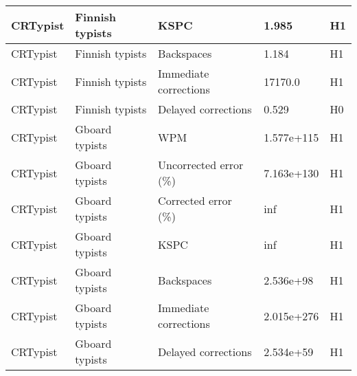 \begin{table}[h!]
\begin{tabular}{|l|l|l|l|l|}
CRTypist & Finnish typists & KSPC & 1.985 & {\cellcolor{bad}} H1 \\ \hline
CRTypist & Finnish typists & Backspaces & 1.184 & {\cellcolor{bad}} H1 \\ \hline
CRTypist & Finnish typists & Immediate corrections & 17170.0 & {\cellcolor{bad}} H1 \\ \hline
CRTypist & Finnish typists & Delayed corrections & 0.529 & {\cellcolor{good}} H0 \\ \hline
CRTypist & Gboard typists & WPM & 1.577e+115 & {\cellcolor{bad}} H1 \\ \hline
CRTypist & Gboard typists & Uncorrected error (\%) & 7.163e+130 & {\cellcolor{bad}} H1 \\ \hline
CRTypist & Gboard typists & Corrected error (\%) & inf & {\cellcolor{bad}} H1 \\ \hline
CRTypist & Gboard typists & KSPC & inf & {\cellcolor{bad}} H1 \\ \hline
CRTypist & Gboard typists & Backspaces & 2.536e+98 & {\cellcolor{bad}} H1 \\ \hline
CRTypist & Gboard typists & Immediate corrections & 2.015e+276 & {\cellcolor{bad}} H1 \\ \hline
CRTypist & Gboard typists & Delayed corrections & 2.534e+59 & {\cellcolor{bad}} H1 \\ \hline
\end{tabular}
\label{tab:typists_metrics}
\end{table}